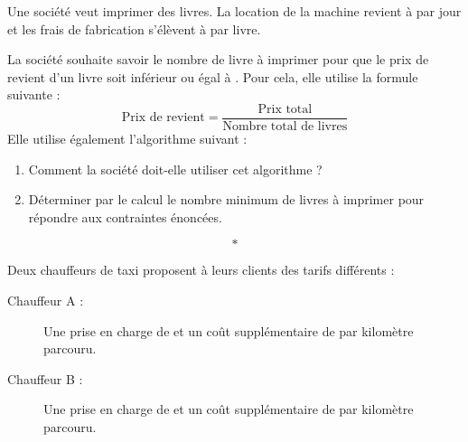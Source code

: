 \documentclass[10pt,openright,twoside,french]{book}
\begin{document}

\exo
Une société veut imprimer des livres. La location de la machine revient à  par jour et les frais de fabrication s'élèvent à  par livre.\par
La société souhaite savoir le nombre de livre à imprimer pour que le prix de revient d'un livre soit inférieur ou égal à . Pour cela, elle utilise la formule suivante :
\[\text{Prix de revient} = \frac{\text{Prix total}}{\text{Nombre total de livres}}\]
Elle utilise également l'algorithme suivant :

\begin{center}
\small
\end{center}

\begin{enumerate}
    \item Comment la société doit-elle utiliser cet algorithme ?
    \item Déterminer par le calcul le nombre minimum de livres à imprimer pour répondre aux contraintes énoncées.
\end{enumerate}

\[*\]

\exo
Deux chauffeurs de taxi proposent à leurs clients des tarifs différents :
\begin{description}
    \item[Chauffeur A :] Une prise en charge de  et un coût supplémentaire de  par kilomètre parcouru.
    \item[Chauffeur B :] Une prise en charge de  et un coût supplémentaire de  par kilomètre parcouru.
\end{description}
\end{document}
